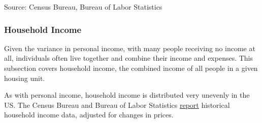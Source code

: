 \documentclass{report}
\newcommand{\tbllink}[1]{\href{https://raw.githubusercontent.com/bdecon/US-chartbook/master/chartbook/data/#1}{\faTable}}
\begin{document}
{\begin{minipage}{1.0\textwidth}
\footnotesize{Source: Census Bureau, Bureau of Labor Statistics}  \hfill \tbllink{pinc_ch_contrib.csv}
\end{minipage}
\newpage
\begin{minipage}{1.0\textwidth}  
\subsubsection*{Household Income}
\small Given the variance in personal income, with many people receiving no income at all, individuals often live together and combine their income and expenses. This subsection covers household income, the combined income of all people in a given housing unit. 

As with personal income, household income is distributed very unevenly in the US. The Census Bureau and Bureau of Labor Statistics \href{https://www.census.gov/data/tables/time-series/demo/income-poverty/cps-hinc.html}{report} historical household income data, adjusted for changes in prices. 
\end{minipage}

}
\end{document}
